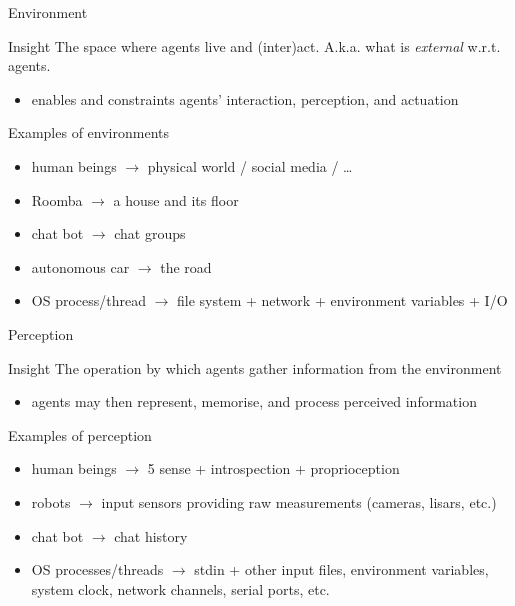 \documentclass[presentation]{beamer}\mode<presentation>{\usetheme{AMSBolognaFC}}
\begin{document}
\begin{frame}[c]{Environment}
%
\begin{block}{Insight}
	The space where agents live and (inter)act. A.k.a. what is \emph{external} w.r.t. agents.
	\begin{itemize}
		\item enables and constraints agents' \alert{interaction}, \alert{perception}, and \alert{actuation}
	\end{itemize}
\end{block}
%
\begin{exampleblock}{Examples of environments}
	\begin{itemize}
		\item human beings $\rightarrow$ physical world / social media / \ldots
		\item Roomba $\rightarrow$ a house and its floor
		\item chat bot $\rightarrow$ chat groups
		\item autonomous car $\rightarrow$ the road
		\item OS process/thread $\rightarrow$ file system + network + environment variables + I/O
	\end{itemize}
\end{exampleblock}
%
\end{frame}

\begin{frame}[c]{Perception}
%
\begin{block}{Insight}
	The operation by which agents gather information from the environment
	\begin{itemize}
		\item agents may then \alert{represent}, \alert{memorise}, and \alert{process} perceived information
	\end{itemize}
\end{block}
%
\begin{exampleblock}{Examples of perception}
	\begin{itemize}
		\item human beings $\rightarrow$ 5 sense + introspection + proprioception 
		\item robots $\rightarrow$ input sensors providing raw measurements (cameras, lisars, etc.)
		\item chat bot $\rightarrow$ chat history
		\item OS processes/threads $\rightarrow$ stdin + other input files, environment variables, system clock, network channels, serial ports, etc.
	\end{itemize}
\end{exampleblock}
%
\end{frame}
\end{document}
